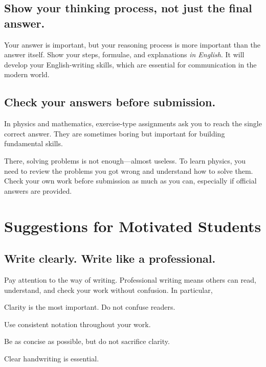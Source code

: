 \documentclass[11pt,pdfa,lastpage,minititle]{MishoNote}
\begin{document}
\OutputNote

\subsection{Show your thinking process, not just the final answer.}
Your answer is important, but your reasoning process is more important than the answer itself.
Show your steps, formulae, and explanations \emph{in English}.
It will develop your English-writing skills, which are essential for communication in the modern world.

\subsection{Check your answers before submission.}
In physics and mathematics, exercise-type assignments ask you to reach the single correct answer.
They are sometimes boring but important for building fundamental skills.

There, solving problems is not enough—almost useless.
To learn physics, you need to review the problems you got wrong and understand how to solve them.
Check your own work before submission as much as you can, especially if official answers are provided.

\section*{Suggestions for Motivated Students}
\subsection{Write clearly. Write like a professional.}
Pay attention to the way of writing.
Professional writing means others can read, understand, and check your work without confusion.
In particular,
\begin{miniitemize}
  \item Clarity is the most important. Do not confuse readers.\vspace{-.3em}
  \item Use consistent notation throughout your work.\vspace{-.3em}
  \item Be as concise as possible, but do not sacrifice clarity.\vspace{-.3em}
  \item Clear handwriting is essential.\vspace{-.5em}
\end{miniitemize}
\end{document}
